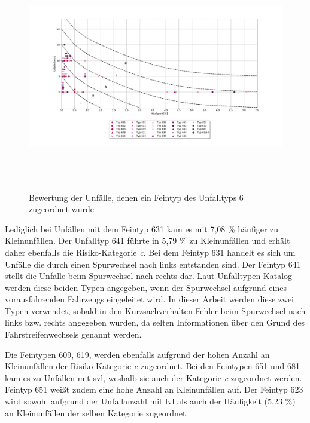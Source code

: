 \begin{savenotes}
	\begin{figure}[H]
		\centering
		\includegraphics[width=18cm,height=10cm]{figures/Bewertung_FT6}
		\caption[Bewertung der Unfälle, denen ein Feintyp des Unfalltyps 6 zugeordnet wurde]{Bewertung der Unfälle, denen ein Feintyp des Unfalltyps 6 zugeordnet wurde}\label{fig:Bewertung_FT6}
	\end{figure}
\end{savenotes}

Lediglich bei Unfällen mit dem Feintyp 631 kam es mit 7,08 \% häufiger zu Kleinunfällen. Der Unfalltyp 641 führte in 5,79 \% zu Kleinunfällen und erhält daher ebenfalls die Risiko-Kategorie \textit{c}. Bei dem Feintyp 631 handelt es sich um Unfälle die durch einen Spurwechsel nach links entstanden sind. Der Feintyp 641 stellt die Unfälle beim Spurwechsel nach rechts dar. Laut Unfalltypen-Katalog werden diese beiden Typen angegeben, wenn der Spurwechsel aufgrund eines vorausfahrenden Fahrzeugs eingeleitet wird. In dieser Arbeit werden diese zwei Typen verwendet, sobald in den Kurzsachverhalten Fehler beim Spurwechsel nach links bzw. rechts angegeben wurden, da selten Informationen über den Grund des Fahrstreifenwechsels genannt werden.  

Die Feintypen 609, 619, werden ebenfalls aufgrund der hohen Anzahl an Kleinunfällen der Risiko-Kategorie \textit{c} zugeordnet. Bei den Feintypen 651 und 681 kam es zu Unfällen mit \ac{svl}, weshalb sie auch der Kategorie \textit{c} zugeordnet werden. Feintyp 651 weißt zudem eine hohe Anzahl an Kleinunfällen auf. Der Feintyp 623 wird sowohl aufgrund der Unfallanzahl mit \ac{lvl} als auch der Häufigkeit (5,23 \%) an Kleinunfällen der selben Kategorie zugeordnet.

